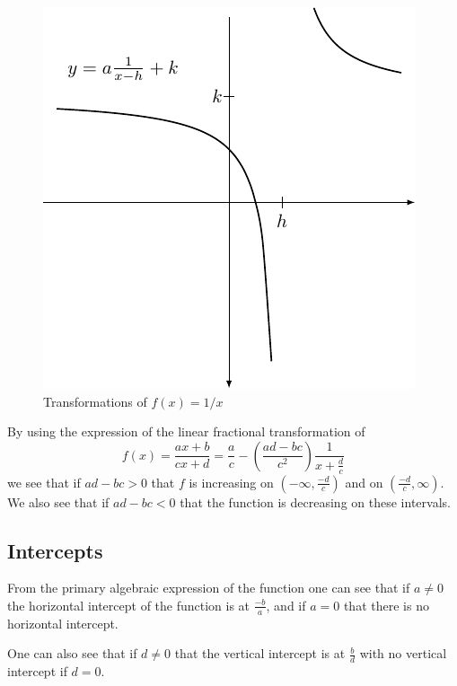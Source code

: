 \documentclass[
]{book}
\theoremstyle{definition}
\theoremstyle{definition}
\theoremstyle{definition}
\theoremstyle{definition}
\theoremstyle{remark}
\begin{document}
\begin{figure}

{\centering \includegraphics[width=1\linewidth]{tikz/x-1transform} 

}

\caption{Transformations of $f(x)=1/x$}\label{fig:LFT-desmos}
\end{figure}

By using the expression of the linear fractional transformation of \[f(x)=\frac{ax+b}{cx+d}= \frac{a}{c} - \left(\frac{ad-bc}{c^2}\right) \frac{1}{x+\frac{d}{c}}\] we see that if
\(ad-bc>0\) that \(f\) is increasing on \((-\infty, \frac{-d}{c})\) and on \((\frac{-d}{c}, \infty)\). We also see that if \(ad-bc<0\) that the function is decreasing on these intervals.

\hypertarget{intercepts-1}{%
\subsection{Intercepts}\label{intercepts-1}}

From the primary algebraic expression of the function one can see that if \(a\neq 0\) the horizontal intercept of the function is at \(\frac{-b}{a}\), and if \(a=0\) that there is no horizontal intercept.

One can also see that if \(d \neq 0\) that the vertical intercept is at \(\frac{b}{d}\) with no vertical intercept if \(d=0\).
\end{document}

